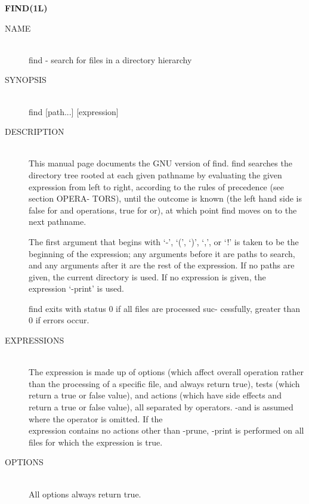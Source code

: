 
\begin{center} {\bf
FIND(1L)
} \end{center}
\begin{description}


\item[NAME] \hfill \\
       find - search for files in a directory hierarchy

\item[SYNOPSIS] \hfill \\
       find [path...] [expression]

\item[DESCRIPTION] \hfill \\
       This  manual page documents the GNU version of find.  find
       searches the directory tree rooted at each given  pathname
       by  evaluating  the  given  expression from left to right,
       according to the rules of precedence (see  section  OPERA-
       TORS),  until  the outcome is known (the left hand side is
       false for and operations, true for  or),  at  which  point
       find moves on to the next pathname.

       The first argument that begins with `-', `(', `)', `,', or
       `!' is taken to be the beginning of  the  expression;  any
       arguments before it are paths to search, and any arguments
       after it are the rest of the expression.  If no paths  are
       given, the current directory is used.  If no expression is
       given, the expression `-print' is used.

       find exits with status 0 if all files are  processed  suc-
       cessfully, greater than 0 if errors occur.

\item[EXPRESSIONS] \hfill \\
       The expression is made up of options (which affect overall
       operation rather than the processing of a  specific  file,
       and  always  return  true),  tests (which return a true or
       false value), and actions (which  have  side  effects  and
       return a true or false value), all separated by operators.
       -and is assumed where the operator  is  omitted.   If  the \\
       expression  contains  no actions other than -prune, -print
       is performed on all files  for  which  the  expression  is
       true.

\item[OPTIONS] \hfill \\
       All options always return true.


\end{description}
